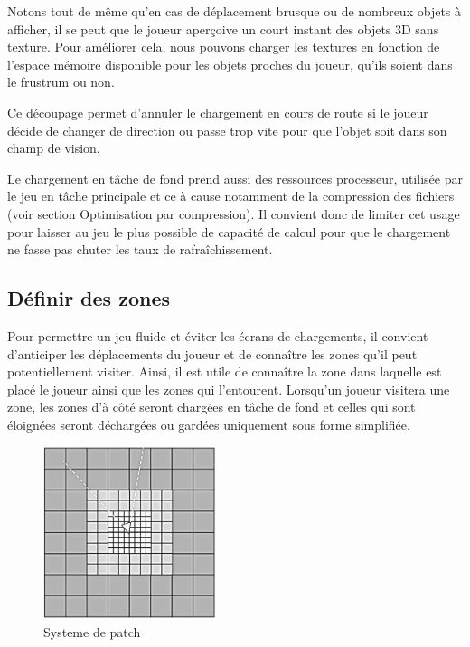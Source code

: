 \documentclass[a4paper, 11pt]{article} %
\begin{document}
Notons tout de même qu'en cas de déplacement brusque ou de nombreux objets à afficher, il se peut que le joueur aperçoive un court instant des objets 3D sans texture. Pour améliorer cela, nous pouvons charger les textures en fonction de l'espace mémoire disponible pour les objets proches du joueur, qu'ils soient dans le frustrum ou non.

Ce découpage permet d'annuler le chargement en cours de route si le joueur décide de changer de direction ou passe trop vite pour que l'objet soit dans son champ de vision.

Le chargement en tâche de fond prend aussi des ressources processeur, utilisée par le jeu en tâche principale et ce à cause notamment de la compression des fichiers (voir section Optimisation par compression). Il convient donc de limiter cet usage pour laisser au jeu le plus possible de capacité de calcul pour que le chargement ne fasse pas chuter les taux de rafraîchissement.

\newpage
\subsection*{Définir des zones}
Pour permettre un jeu fluide et éviter les écrans de chargements, il convient d'anticiper les déplacements du joueur et de connaître les zones qu'il peut potentiellement visiter. Ainsi, il est utile de connaître la zone dans laquelle est placé le joueur ainsi que les zones qui l'entourent. Lorsqu'un joueur visitera une zone, les zones d'à côté seront chargées en tâche de fond et celles qui sont éloignées seront déchargées ou gardées uniquement sous forme simplifiée.

\begin{figure}
\begin{center}
\includegraphics[width=0.45\textwidth]{images/patch-system-three.png}
\end{center}
\caption{Systeme de patch}
\end{figure}
\end{document}

